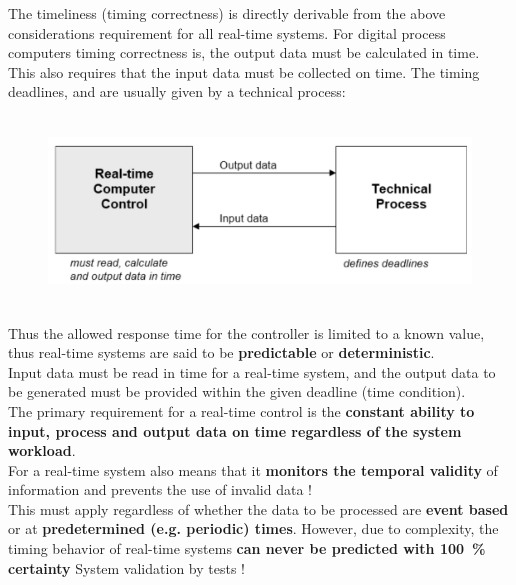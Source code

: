 The timeliness (timing correctness) is directly derivable from the above considerations requirement for all real-time systems. For digital process computers timing correctness is, the output data must be calculated in time.\\

This also requires that the input data must be collected on time. The timing deadlines, and are usually given by a technical process:\\

\begin{figure}[h]
    \centering
    \includegraphics[width=12cm, height=5cm]{Images/image61.png}
    \label{fig:Fig 7}
\end{figure}

Thus the allowed response time for the controller is limited to a known value, thus real-time systems are said to be \textbf{predictable} or \textbf{deterministic}.\\

Input data must be read in time for a real-time system, and the output data to be generated must be provided within the given deadline (time condition). \\

The primary requirement for a real-time control is the \textbf{constant ability to input, process and output data on time regardless of the system workload}.\\ 

For a real-time system also means that it \textbf{monitors the temporal validity} of information and prevents the use of invalid data !\\

This must apply regardless of whether the data to be processed are \textbf{event based} or at \textbf{predetermined (e.g. periodic) times}. However, due to complexity, the timing behavior of real-time systems \textbf{can never be predicted with 100~\% certainty}  System validation by tests !\\

